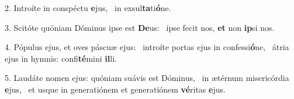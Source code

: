 2. Introíte in conspéctu \textbf{e}jus, \ast\  in exsul\textbf{ta}ti\textbf{ó}ne.\

3. Scitóte quóniam Dóminus ipse est \textbf{De}us: \ast\  ipse fecit nos, \textbf{et} non \textbf{ip}si nos.\

4. Pópulus ejus, et oves páscuæ ejus: \dag\  introíte portas ejus in confessi\textbf{ó}ne, \ast\  átria ejus in hymnis: confi\textbf{té}mini \textbf{il}li.\

5. Laudáte nomen ejus: quóniam suávis est Dóminus, \dag\  in ætérnum misericórdia \textbf{e}jus, \ast\  et usque in generatiónem et generatiónem \textbf{vé}ritas \textbf{e}jus.\

